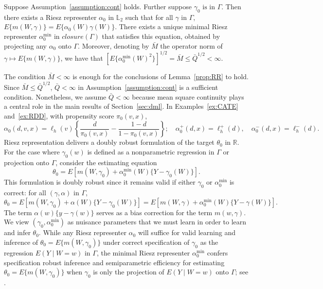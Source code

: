 \begin{lemma}\label{prop:RR}
Suppose Assumption~\ref{assumption:cont} holds. Further suppose $\gamma_0\text{ is in } \Gamma$. Then there exists a Riesz representer $\alpha_0\text{ in } \mathbb{L}_2$ such that for all $\gamma$ in $\Gamma$, 
$
E\{m(W,\gamma)\}=E\{\alpha_0(W)\gamma(W)\}.
$
There exists a unique minimal Riesz representer $\alpha_0^{\min}\text{ in } closure(\Gamma)$ that satisfies this equation, obtained by projecting any $\alpha_0$ onto $\Gamma$. Moreover, denoting by $\bar{M}$ the operator norm of $\gamma\mapsto E\{m(W,\gamma)\}$, we have that
$
[E\{\alpha_0^{\min}(W)^2\}]^{1/2}=\bar{M} \leq \bar{Q}^{1/2}<\infty.
$
\end{lemma}
The condition $\bar{M}<\infty$ is enough for the conclusions of Lemma~\ref{prop:RR} to hold. Since $\bar{M}\leq \bar{Q}^{1/2}$, $\bar{Q}<\infty$ in Assumption~\ref{assumption:cont} is a sufficient condition. Nonetheless, we assume $\bar{Q}<\infty$ because mean square continuity plays a central role in the main results of Section~\ref{sec:dml}. In Examples~\ref{ex:CATE} and~\ref{ex:RDD}, with propensity score $\pi_0(v,x)$,
    $$
    \alpha_0(d,v,x)=\ell_h(v)\left\{\frac{d}{\pi_0(v,x)}-\frac{1-d}{1-\pi_0(v,x)}\right\};\quad
    \alpha^+_0(d,x)=\ell_h^{+}(d),
    \quad 
     \alpha^-_0(d,x)=\ell_h^{-}(d).
    $$
Riesz representation delivers a doubly robust formulation of the target $\theta_0\text{ in }\mathbb{R}$. For the case where $\gamma_0(w)$ is defined as a nonparametric regression in $\Gamma$ or projection onto $\Gamma$, consider the estimating equation
$$
\theta_0=E[m(W,\gamma_0)+\alpha^{\min}_0(W)\{Y-\gamma_0(W)\}].
$$
This formulation is doubly robust since it remains valid if either $\gamma_0$ or $\alpha^{\min}_0$ is correct: for all $(\gamma,\alpha)$ in $\Gamma$,
$$
\theta_0=E[m(W,\gamma_0)+\alpha(W)\{Y-\gamma_0(W)\}]=E[m(W,\gamma)+\alpha^{\min}_0(W)\{Y-\gamma(W)\}].
$$
The term $\alpha(w)\{y-\gamma(w)\}$ serves as a bias correction for the term $m(w,\gamma)$. We view $(\gamma_0,\alpha^{\min}_0)$ as nuisance parameters that we must learn in order to learn and infer $\theta_0$. While any Riesz representer $\alpha_0$ will suffice for valid learning and inference of $\theta_0=E\{m(W,\gamma_0)\}$ under correct specification of $\gamma_0$ as the regression $E(Y \mid W=w)$ in $\Gamma$, the minimal Riesz representer $\alpha_0^{\min}$ confers specification robust inference and semiparametric efficiency for estimating $\theta_0=E\{m(W,\gamma_0)\}$ when $\gamma_0$ is only the projection of $E(Y \mid W=w)$ onto $\Gamma$; see \cite[Theorem 4.2]{chernozhukov2018global}.

